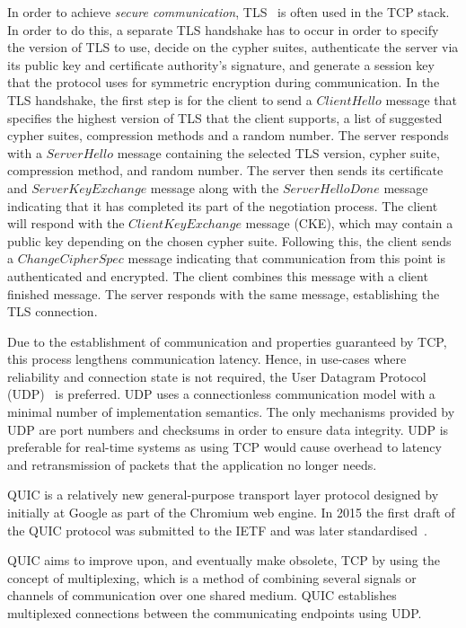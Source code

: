 In order to achieve \textit{secure communication}, TLS~\citep{rescorla_transport_2018} is often used in the TCP stack.
In order to do this, a separate TLS handshake has to occur in order to specify the version of TLS to use, decide on the cypher suites, authenticate the server via its public key and certificate authority's signature, and generate a session key that the protocol uses for symmetric encryption during communication.
In the TLS handshake, the first step is for the client to send a $ClientHello$ message that specifies the highest version of TLS that the client supports, a list of suggested cypher suites, compression methods and a random number.
The server responds with a $ServerHello$ message containing the selected TLS version, cypher suite, compression method, and random number.
The server then sends its certificate and $ServerKeyExchange$ message along with the $ServerHelloDone$ message indicating that it has completed its part of the negotiation process.
The client will respond with the $ClientKeyExchange$ message (CKE), which may contain a public key depending on the chosen cypher suite.
Following this, the client sends a $ChangeCipherSpec$ message indicating that communication from this point is authenticated and encrypted.
The client combines this message with a client finished message.
The server responds with the same message, establishing the TLS connection.

Due to the establishment of communication and properties guaranteed by TCP, this process lengthens communication latency.
Hence, in use-cases where reliability and connection state is not required, the User Datagram Protocol (UDP)~\citep{j_postel_1980} is preferred.
UDP uses a connectionless communication model with a minimal number of implementation semantics. The only mechanisms provided by UDP are port numbers and checksums in order to ensure data integrity.
UDP is preferable for real-time systems as using TCP would cause overhead to latency and retransmission of packets that the application no longer needs.

QUIC is a relatively new general-purpose transport layer protocol designed by~\citet{jim_roskind_2012} initially at Google as part of the Chromium web engine.
In 2015 the first draft of the QUIC protocol was submitted to the IETF and was later standardised~\citep{iyengar_quic_2021}.

QUIC aims to improve upon, and eventually make obsolete, TCP by using the concept of multiplexing, which is a method of combining several signals or channels of communication over one shared medium.
QUIC establishes multiplexed connections between the communicating endpoints using UDP.

